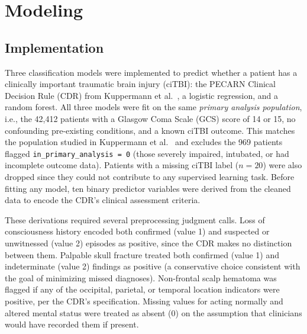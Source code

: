 \documentclass[11pt,letterpaper]{article}
\begin{document}
\section{Modeling}

\subsection{Implementation}

Three classification models were implemented to predict whether a patient has a clinically important traumatic brain injury (ciTBI): the PECARN
Clinical Decision Rule (CDR) from Kuppermann et al.~\cite{kuppermann2009}, a logistic regression, and a random forest. All three models were fit on the same \textit{primary analysis population}, i.e., the 42,412 patients with a Glasgow Coma Scale (GCS) score of 14 or 15, no confounding pre-existing conditions, and a known ciTBI outcome. This matches the population studied in Kuppermann et al.~\cite{kuppermann2009} and excludes the 969 patients flagged \texttt{in\_primary\_analysis = 0} (those severely impaired, intubated, or had incomplete outcome data). Patients with a missing ciTBI label ($n = 20$) were also dropped since they could not contribute to any supervised learning task. Before fitting any model, ten binary predictor variables were derived from the cleaned data to encode the CDR's clinical assessment criteria. 

These derivations required several preprocessing judgment calls. Loss of consciousness history encoded both confirmed (value 1) and suspected or unwitnessed (value 2) episodes as positive, since the CDR makes no distinction between them. Palpable skull fracture treated both confirmed (value 1) and indeterminate (value 2) findings as positive (a conservative choice consistent with the goal of minimizing missed diagnoses). Non-frontal scalp hematoma was flagged if any of the occipital, parietal, or temporal location indicators were positive, per the CDR's specification. Missing values for acting normally and altered mental status were treated as absent (0) on the assumption that clinicians would have recorded them if present.
\end{document}
